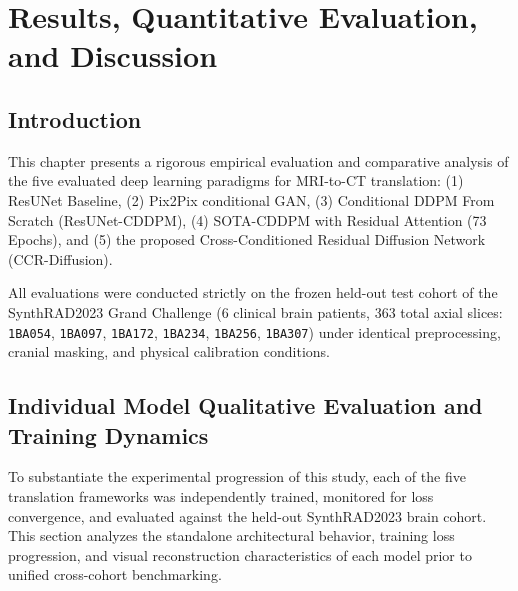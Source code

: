 \chapter{Results, Quantitative Evaluation, and Discussion}

\section{Introduction}
This chapter presents a rigorous empirical evaluation and comparative analysis of the five evaluated deep learning paradigms for MRI-to-CT translation:
(1) ResUNet Baseline,
(2) Pix2Pix conditional GAN,
(3) Conditional DDPM From Scratch (ResUNet-CDDPM),
(4) SOTA-CDDPM with Residual Attention (73 Epochs), and
(5) the proposed Cross-Conditioned Residual Diffusion Network (CCR-Diffusion).

All evaluations were conducted strictly on the frozen held-out test cohort of the SynthRAD2023 Grand Challenge (6 clinical brain patients, 363 total axial slices: \texttt{1BA054}, \texttt{1BA097}, \texttt{1BA172}, \texttt{1BA234}, \texttt{1BA256}, \texttt{1BA307}) under identical preprocessing, cranial masking, and physical calibration conditions.

\section{Individual Model Qualitative Evaluation and Training Dynamics}
To substantiate the experimental progression of this study, each of the five translation frameworks was independently trained, monitored for loss convergence, and evaluated against the held-out SynthRAD2023 brain cohort. This section analyzes the standalone architectural behavior, training loss progression, and visual reconstruction characteristics of each model prior to unified cross-cohort benchmarking.

